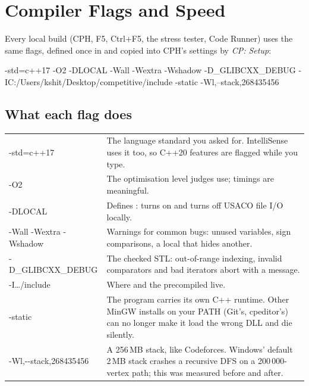 \chapter{Compiler Flags and Speed}\label{ch:compiler}

Every local build (CPH, F5, Ctrl+F5, the stress tester, Code Runner) uses the same flags, defined once in
 and copied into CPH's settings by \emph{CP: Setup}:

\begin{shell}
-std=c++17 -O2 -DLOCAL -Wall -Wextra -Wshadow -D_GLIBCXX_DEBUG
-IC:/Users/kshit/Desktop/competitive/include -static -Wl,--stack,268435456
\end{shell}

\section{What each flag does}

\begin{center}
\begin{tabularx}{\linewidth}{>{\ttfamily\raggedright\arraybackslash}p{4.3cm}L}
\toprule
{} &  \\
\midrule
-std=c++17 & The language standard you asked for. IntelliSense uses it too, so C++20 features are flagged while you type. \\
-O2 & The optimisation level judges use; timings are meaningful. \\
-DLOCAL & Defines : turns on  and turns off USACO file I/O locally. \\
-Wall -Wextra -Wshadow & Warnings for common bugs: unused variables, sign comparisons, a local that hides another. \\
-D\_GLIBCXX\_DEBUG & The checked STL: out-of-range indexing, invalid comparators and bad iterators abort with a message. \\
-I\ldots/include & Where  and the precompiled  live. \\
-static & The program carries its own C++ runtime. Other MinGW installs on your PATH (Git's, cpeditor's) can no longer
  make it load the wrong DLL and die silently. \\
-Wl,-{}-stack,268435456 & A 256\,MB stack, like Codeforces. Windows' default 2\,MB stack crashes a recursive DFS on a
  200\,000-vertex path; this was measured before and after. \\
\bottomrule
\end{tabularx}
\end{center}

